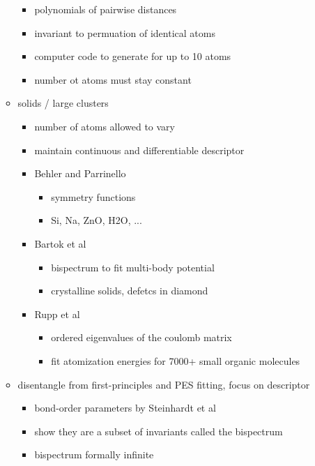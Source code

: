 \documentclass[11pt]{article}
\providecommand{\tightlist}{%
      \setlength{\itemsep}{0pt}\setlength{\parskip}{0pt}}
\begin{document}
\begin{itemize}
\begin{itemize}
    \begin{itemize}
    \tightlist
    \item
      polynomials of pairwise distances
    \item
      invariant to permuation of identical atoms
    \item
      computer code to generate for up to 10 atoms
    \item
      number ot atoms must stay constant
    \end{itemize}
  \item
    solids / large clusters

    \begin{itemize}
    \tightlist
    \item
      number of atoms allowed to vary
    \item
      maintain continuous and differentiable descriptor
    \item
      Behler and Parrinello

      \begin{itemize}
      \tightlist
      \item
        symmetry functions
      \item
        Si, Na, ZnO, H2O, ...
      \end{itemize}
    \item
      Bartok et al

      \begin{itemize}
      \tightlist
      \item
        bispectrum to fit multi-body potential
      \item
        crystalline solids, defetcs in diamond
      \end{itemize}
    \item
      Rupp et al

      \begin{itemize}
      \tightlist
      \item
        ordered eigenvalues of the coulomb matrix
      \item
        fit atomization energies for 7000+ small organic molecules
      \end{itemize}
    \end{itemize}
  \item
    disentangle from first-principles and PES fitting, focus on
    descriptor

    \begin{itemize}
    \tightlist
    \item
      bond-order parameters by Steinhardt et al
    \item
      show they are a subset of invariants called the bispectrum
    \item
      bispectrum formally infinite


\end{itemize}
\end{itemize}
\end{itemize}
\end{document}
